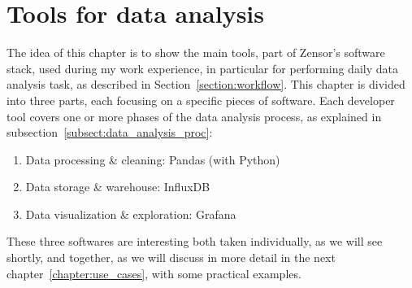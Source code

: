 \chapter{Tools for data analysis}
The idea of this chapter is to show the main tools, part of Zensor's software stack, used during my work experience, in particular for performing daily data analysis task, as described in Section~\ref{section:workflow}.
This chapter is divided into three parts, each focusing on a specific pieces of software. Each developer tool covers one or more phases of the data analysis process, as explained in subsection~\ref{subsect:data_analysis_proc}:
\begin{enumerate}
    \item Data processing \& cleaning: Pandas (with Python)
    \item Data storage \& warehouse: InfluxDB
    \item Data visualization \& exploration: Grafana 
\end{enumerate}
These three softwares are interesting both taken individually, as we will see shortly, and together, as we will discuss in more detail in the next chapter~\ref{chapter:use_cases}, with some practical examples.





